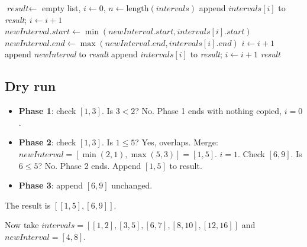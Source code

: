 \begin{algorithm}[H]
\caption{Insert Interval}
\begin{algorithmic}[1]
  \State $\textit{result} \gets$ empty list, $i \gets 0$, $n \gets \text{length}(\textit{intervals})$
    \State append $\textit{intervals}[i]$ to \textit{result}; $i \gets i+1$
  \EndWhile
    \State $\textit{newInterval}.\textit{start} \gets \min(\textit{newInterval}.\textit{start}, \textit{intervals}[i].\textit{start})$
    \State $\textit{newInterval}.\textit{end} \gets \max(\textit{newInterval}.\textit{end}, \textit{intervals}[i].\textit{end})$
    \State $i \gets i + 1$
  \EndWhile
  \State append \textit{newInterval} to \textit{result}
    \State append $\textit{intervals}[i]$ to \textit{result}; $i \gets i+1$
  \EndWhile
  \State \Return \textit{result}
\EndProcedure
\end{algorithmic}
\end{algorithm}

\subsection*{Dry run}


\begin{itemize}
  \item \textbf{Phase 1}: check $[1,3]$. Is $3 < 2$? No. Phase 1 ends with
        nothing copied, $i=0$.
  \item \textbf{Phase 2}: check $[1,3]$. Is $1 \le 5$? Yes, overlaps. Merge:
        $\textit{newInterval} = [\min(2,1), \max(5,3)] = [1,5]$. $i=1$.
        Check $[6,9]$. Is $6 \le 5$? No. Phase 2 ends. Append $[1,5]$ to
        result.
  \item \textbf{Phase 3}: append $[6,9]$ unchanged.
\end{itemize}

The result is $[[1,5],[6,9]]$.

Now take $\textit{intervals} = [[1,2],[3,5],[6,7],[8,10],[12,16]]$ and
$\textit{newInterval} = [4,8]$.

